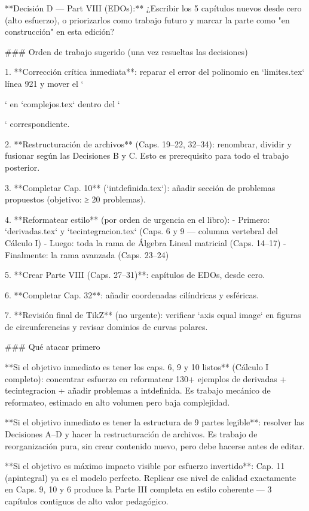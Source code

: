 \begin{myproof}
\begin{pasos}
\begin{example}
\begin{rem}
\begin{prob}
\begin{myproof}
\begin{prob}
**Decisión D — Part VIII (EDOs):** ¿Escribir los 5 capítulos nuevos desde cero (alto esfuerzo), o priorizarlos como trabajo futuro y marcar la parte como "en construcción" en esta edición?

### Orden de trabajo sugerido (una vez resueltas las decisiones)

1. **Corrección crítica inmediata**: reparar el error del polinomio en `limites.tex` línea 921 y mover el `\begin{myproof}` en `complejos.tex` dentro del `\begin{prob}` correspondiente.

2. **Restructuración de archivos** (Caps. 19–22, 32–34): renombrar, dividir y fusionar según las Decisiones B y C. Esto es prerequisito para todo el trabajo posterior.

3. **Completar Cap. 10** (`intdefinida.tex`): añadir sección de problemas propuestos (objetivo: ≥ 20 problemas).

4. **Reformatear estilo** (por orden de urgencia en el libro):
   - Primero: `derivadas.tex` y `tecintegracion.tex` (Caps. 6 y 9 — columna vertebral del Cálculo I)
   - Luego: toda la rama de Álgebra Lineal matricial (Caps. 14–17)
   - Finalmente: la rama avanzada (Caps. 23–24)

5. **Crear Parte VIII (Caps. 27–31)**: capítulos de EDOs, desde cero.

6. **Completar Cap. 32**: añadir coordenadas cilíndricas y esféricas.

7. **Revisión final de TikZ** (no urgente): verificar `axis equal image` en figuras de circunferencias y revisar dominios de curvas polares.

### Qué atacar primero

**Si el objetivo inmediato es tener los caps. 6, 9 y 10 listos** (Cálculo I completo): concentrar esfuerzo en reformatear 130+ ejemplos de derivadas + tecintegracion + añadir problemas a intdefinida. Es trabajo mecánico de reformateo, estimado en alto volumen pero baja complejidad.

**Si el objetivo inmediato es tener la estructura de 9 partes legible**: resolver las Decisiones A–D y hacer la restructuración de archivos. Es trabajo de reorganización pura, sin crear contenido nuevo, pero debe hacerse antes de editar.

**Si el objetivo es máximo impacto visible por esfuerzo invertido**: Cap. 11 (apintegral) ya es el modelo perfecto. Replicar ese nivel de calidad exactamente en Caps. 9, 10 y 6 produce la Parte III completa en estilo coherente — 3 capítulos contiguos de alto valor pedagógico.


\end{prob}
\end{myproof}
\end{prob}
\end{myproof}
\end{prob}
\end{rem}
\end{example}
\end{pasos}
\end{myproof}
